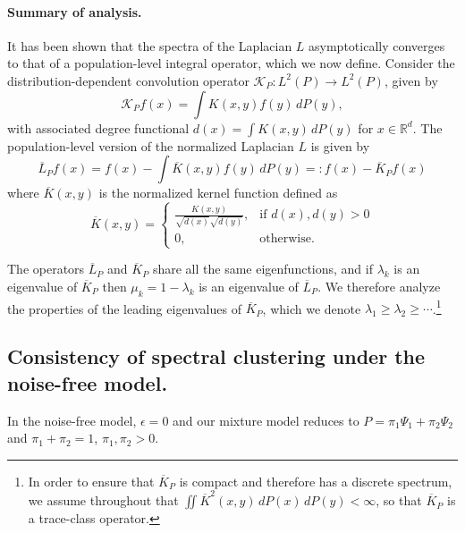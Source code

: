 \documentclass{article}
\newcommand{\Reals}{\mathbb{R}}
\newcommand{\1}{\mathbf{1}}
\newcommand{\Rd}{\Reals^d}
\theoremstyle{alden}
\theoremstyle{aldenthm}
\theoremstyle{definition}
\theoremstyle{remark}
\begin{document}
\paragraph{Summary of analysis.}

It has been shown that the spectra of the Laplacian $L$ asymptotically converges to that of a population-level integral operator, which we now define. Consider the distribution-dependent convolution operator $\mathcal{K}_P: L^2(P) \to L^2(P)$, given by
\begin{equation*}
\mathcal{K}_Pf(x) = \int K(x,y) f(y) \,dP(y),
\end{equation*}
with associated degree functional $d(x) = \int K(x,y) \,dP(y)$ for $x \in \Rd$. The population-level version of the normalized Laplacian $L$ is given by
\begin{equation}
\label{eqn:normalized_Laplacian_operator}
\overline{L}_Pf(x) = f(x) - \int \overline{K}(x,y) f(y) \,dP(y) =: f(x) - \overline{K}_Pf(x)
\end{equation}
where $\overline{K}(x,y)$ is the normalized kernel function defined as
\begin{equation*}
\overline{K}(x,y) = 
\begin{cases}
\frac{K(x,y)}{\sqrt{d(x)}\sqrt{d(y)}}, & \textrm{if $d(x), d(y) > 0$} \\
0, & \textrm{otherwise.}
\end{cases}
\end{equation*}

The operators $\overline{L}_P$ and $\overline{K}_P$ share all the same eigenfunctions, and if $\lambda_k$ is an eigenvalue of $\overline{K}_P$ then $\mu_k = 1 - \lambda_k$ is an eigenvalue of $\overline{L}_P$. We therefore analyze the properties of the leading eigenvalues of $\overline{K}_P$, which we denote $\lambda_1 \geq \lambda_2 \geq \cdots$.\footnote{In order to ensure that $\overline{K}_P$ is compact and therefore has a discrete spectrum, we assume throughout that $\iint \overline{K}^2(x,y) \,dP(x) \,dP(y) < \infty$, so that $\overline{K}_P$ is a trace-class operator.}

\subsection{Consistency of spectral clustering under the noise-free model.}

In the noise-free model, $\epsilon = 0$ and our mixture model reduces to $P = \pi_1 \Psi_1 + \pi_2 \Psi_2$ and $\pi_1 + \pi_2 = 1$, $\pi_1, \pi_2 > 0$.
\end{document}
